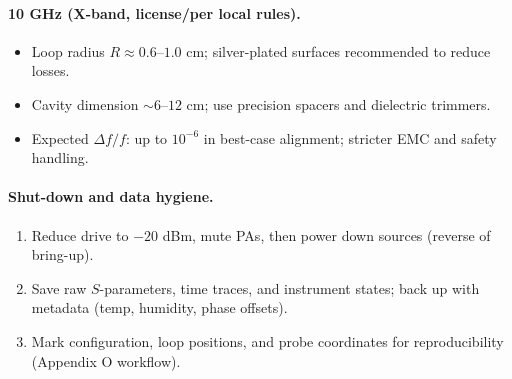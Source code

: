 \paragraph{10 GHz (X-band, license/per local rules).}
\begin{itemize}
\item Loop radius $R \approx 0.6$--$1.0$ cm; silver-plated surfaces recommended to reduce losses.
\item Cavity dimension $\sim 6$--$12$ cm; use precision spacers and dielectric trimmers.
\item Expected $\Delta f/f$: up to $10^{-6}$ in best-case alignment; stricter EMC and safety handling.
\end{itemize}

\paragraph{Shut-down and data hygiene.}
\begin{enumerate}
\item Reduce drive to \(-20\) dBm, mute PAs, then power down sources (reverse of bring-up).
\item Save raw $S$-parameters, time traces, and instrument states; back up with metadata (temp, humidity, phase offsets).
\item Mark configuration, loop positions, and probe coordinates for reproducibility (Appendix O workflow).
\end{enumerate}

